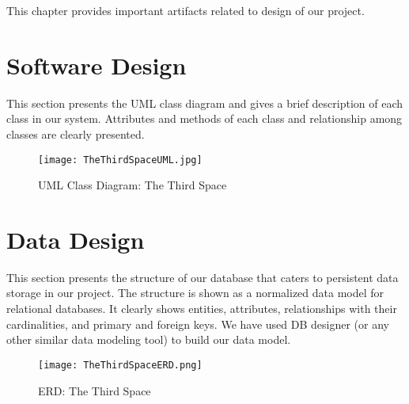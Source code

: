 This chapter provides important artifacts related to design of our project.

\section{Software Design}

This section presents the UML class diagram and gives a brief description of each class in our system. Attributes and methods of each class and relationship among classes are clearly presented.

\begin{figure}
  \caption{UML Class Diagram: The Third Space}
  \texttt{[image: TheThirdSpaceUML.jpg]}
  \centering
\end{figure}


\section{Data Design}

This section presents the structure of our database that caters to persistent data storage in our project. The structure is shown as a normalized data model for relational databases. It clearly shows entities, attributes, relationships with their cardinalities, and primary and foreign keys. We have used DB designer (or any other similar data modeling tool) to build our data model.
\begin{figure}
  \caption{ERD: The Third Space}
  \texttt{[image: TheThirdSpaceERD.png]}
  \centering
\end{figure}
